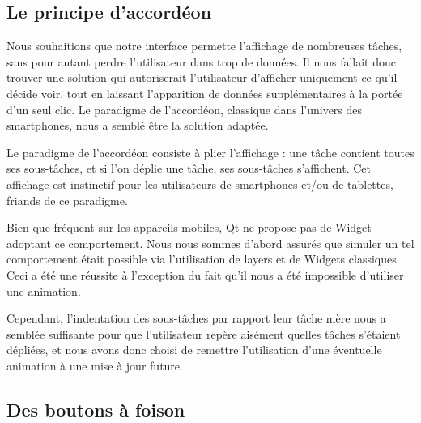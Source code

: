 \documentclass[11pt]{article}
\begin{document}


\subsection{Le principe d'accordéon}
\label{sec:accordeon}

Nous souhaitions que notre interface permette l'affichage de
nombreuses tâches, sans pour autant perdre l'utilisateur dans trop de
données. Il nous fallait donc trouver une solution qui autoriserait
l'utilisateur d'afficher uniquement ce qu'il décide voir, tout en
laissant l'apparition de données supplémentaires à la portée d'un seul
clic. Le paradigme de l'accordéon, classique dans l'univers des
smartphones, nous a semblé être la solution adaptée.

Le paradigme de l'accordéon consiste à plier l'affichage : une tâche
contient toutes ses sous-tâches, et si l'on déplie une tâche, ses
sous-tâches s'affichent. Cet affichage est instinctif pour les
utilisateurs de smartphones et/ou de tablettes, friands de ce
paradigme.

Bien que fréquent sur les appareils mobiles, Qt ne propose pas de
Widget adoptant ce comportement. Nous nous sommes d'abord assurés que
simuler un tel comportement était possible via l'utilisation de layers
et de Widgets classiques. Ceci a été une réussite à l'exception du
fait qu'il nous a été impossible d'utiliser une animation.

Cependant, l'indentation des sous-tâches par rapport leur tâche mère
nous a semblée suffisante pour que l'utilisateur repère aisément
quelles tâches s'étaient dépliées, et nous avons donc choisi de
remettre l'utilisation d'une éventuelle animation à une mise à jour
future.




\subsection{Des boutons à foison}
\label{subsec:boutonFoison}
\end{document}
